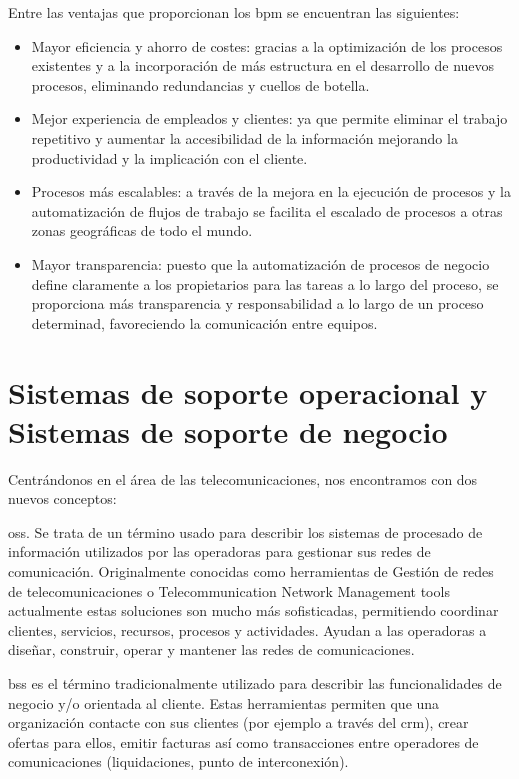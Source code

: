 Entre las ventajas que proporcionan los \acrshort{bpm} se encuentran las siguientes:

\begin{itemize}
\item Mayor eficiencia y ahorro de costes: gracias a la optimización de los procesos existentes y a la incorporación de más estructura en el desarrollo de nuevos procesos, eliminando redundancias y cuellos de botella.
\item Mejor experiencia de empleados y clientes: ya que permite eliminar el trabajo repetitivo y aumentar la accesibilidad de la información mejorando la productividad y la implicación con el cliente.
\item Procesos más escalables: a través de la mejora en la ejecución de procesos y la automatización de flujos de trabajo se facilita el escalado de procesos a otras zonas geográficas de todo el mundo.
\item Mayor transparencia: puesto que la automatización de procesos de negocio define claramente a los propietarios para las tareas a lo largo del proceso, se proporciona más transparencia y responsabilidad a lo largo de un proceso determinad, favoreciendo la comunicación entre equipos.
\end{itemize}




\section{Sistemas de soporte operacional y Sistemas de soporte de negocio}

Centrándonos en el área de las telecomunicaciones, nos encontramos con dos nuevos conceptos:


\acrfull{oss}. Se trata de un término usado para describir los sistemas de procesado de información utilizados por las operadoras para gestionar sus redes de comunicación. Originalmente conocidas como herramientas de Gestión de redes de telecomunicaciones o Telecommunication Network Management tools actualmente estas soluciones son mucho más sofisticadas, permitiendo coordinar clientes, servicios, recursos, procesos y actividades. Ayudan a las operadoras a diseñar, construir, operar y mantener las redes de comunicaciones.

\acrfull{bss} es el término tradicionalmente utilizado para describir las funcionalidades de negocio y/o orientada al cliente. Estas herramientas  permiten que una organización contacte con sus clientes (por ejemplo a través del \acrshort{crm}), crear ofertas para ellos, emitir facturas así como transacciones entre operadores de comunicaciones (liquidaciones, punto de interconexión).


